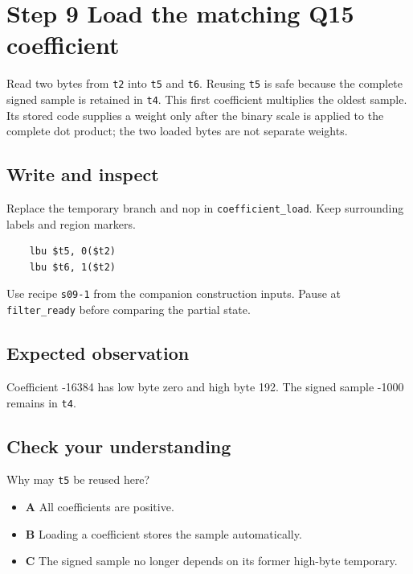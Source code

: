\section{Step 9 Load the matching Q15 coefficient}\label{fir-s09}

Read two bytes from \texttt{t2} into \texttt{t5} and \texttt{t6}. Reusing \texttt{t5} is safe because the complete signed sample is retained in \texttt{t4}. This first coefficient multiplies the oldest sample. Its stored code supplies a weight only after the binary scale is applied to the complete dot product; the two loaded bytes are not separate weights.

\subsection{Write and inspect}
Replace the temporary branch and nop in \texttt{coefficient\_load}. Keep surrounding labels and region markers.

\begin{verbatim}
    lbu $t5, 0($t2)
    lbu $t6, 1($t2)
\end{verbatim}
Use recipe \texttt{s09-1} from the companion construction inputs. Pause at \texttt{filter\_ready} before comparing the partial state.

\subsection{Expected observation}
Coefficient -16384 has low byte zero and high byte 192. The signed sample -1000 remains in \texttt{t4}.

\subsection{Check your understanding}
Why may \texttt{t5} be reused here?

\begin{itemize}
  \item \textbf{A} All coefficients are positive.
  \item \textbf{B} Loading a coefficient stores the sample automatically.
  \item \textbf{C} The signed sample no longer depends on its former high-byte temporary.
\end{itemize}
